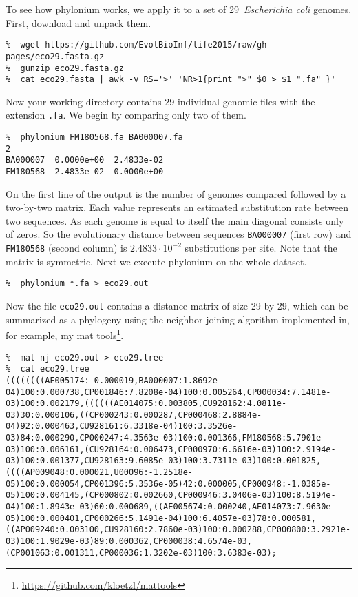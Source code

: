 \documentclass[a4paper,10pt,english]{scrartcl}
\newcommand{\tool}[1]{\textsf{#1}}
\newcommand{\phylonium}{\textsf{phylonium}\xspace}
\begin{document}
To see how \phylonium works, we apply it to a set of 29~\textit{Escherichia coli} genomes. First, download and unpack them.

\begin{lstlisting}
%  wget https://github.com/EvolBioInf/life2015/raw/gh-pages/eco29.fasta.gz
%  gunzip eco29.fasta.gz
%  cat eco29.fasta | awk -v RS='>' 'NR>1{print ">" $0 > $1 ".fa" }'
\end{lstlisting}

Now your working directory contains 29 individual genomic files with the extension \lstinline!.fa!. We begin by comparing only two of them.

\begin{lstlisting}
%  phylonium FM180568.fa BA000007.fa 
2
BA000007  0.0000e+00  2.4833e-02
FM180568  2.4833e-02  0.0000e+00
\end{lstlisting}

On the first line of the output is the number of genomes compared followed by a two-by-two matrix. Each value represents an estimated substitution rate between two sequences. As each genome is equal to itself the main diagonal consists only of zeros. So the evolutionary distance between sequences \lstinline!BA000007! (first row) and \lstinline!FM180568! (second column) is $2.4833 \cdot{10}^{-2}$ substitutions per site. Note that the matrix is symmetric. Next we execute \phylonium on the whole dataset.

\begin{lstlisting}
%  phylonium *.fa > eco29.out
\end{lstlisting}

Now the file \lstinline!eco29.out! contains a distance matrix of size 29 by 29, which can be summarized as a phylogeny using the neighbor-joining algorithm implemented in, for example, my \tool{mat tools}\footnote{\url{https://github.com/kloetzl/mattools}}.

\begin{lstlisting}
%  mat nj eco29.out > eco29.tree
%  cat eco29.tree
((((((((AE005174:-0.000019,BA000007:1.8692e-04)100:0.000738,CP001846:7.8208e-04)100:0.005264,CP000034:7.1481e-03)100:0.002179,((((((AE014075:0.003805,CU928162:4.0811e-03)30:0.000106,((CP000243:0.000287,CP000468:2.8884e-04)92:0.000463,CU928161:6.3318e-04)100:3.3526e-03)84:0.000290,CP000247:4.3563e-03)100:0.001366,FM180568:5.7901e-03)100:0.006161,(CU928164:0.006473,CP000970:6.6616e-03)100:2.9194e-03)100:0.001377,CU928163:9.6085e-03)100:3.7311e-03)100:0.001825,((((AP009048:0.000021,U00096:-1.2518e-05)100:0.000054,CP001396:5.3536e-05)42:0.000005,CP000948:-1.0385e-05)100:0.004145,(CP000802:0.002660,CP000946:3.0406e-03)100:8.5194e-04)100:1.8943e-03)60:0.000689,((AE005674:0.000240,AE014073:7.9630e-05)100:0.000401,CP000266:5.1491e-04)100:6.4057e-03)78:0.000581,((AP009240:0.003100,CU928160:2.7860e-03)100:0.000288,CP000800:3.2921e-03)100:1.9029e-03)89:0.000362,CP000038:4.6574e-03,(CP001063:0.001311,CP000036:1.3202e-03)100:3.6383e-03);
\end{lstlisting}
\end{document}
